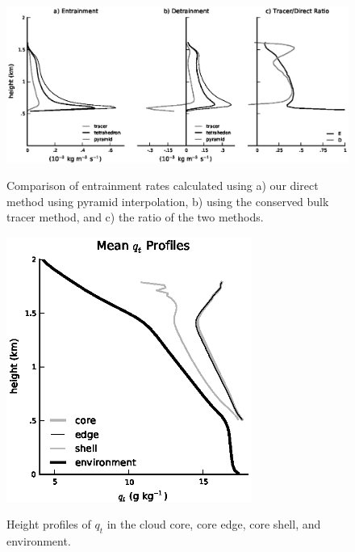 \documentclass[12pt]{article}
\begin{document}
\begin{figure}[t]
  \noindent\includegraphics[width=40pc,angle=0]{./figures/direct_vs_tracer_core.eps}\\
  \caption{Comparison of entrainment rates calculated using a) our direct method 
using pyramid interpolation, b) using the conserved bulk tracer method, and 
c) the ratio of the two methods.}\label{fig:direct_vs_tracer}
\end{figure}

\begin{figure}[t]
  \noindent\includegraphics[width=19pc,angle=0]{./figures/shell_edge_profiles_core.eps}\\
  \caption{Height profiles of $q_t$ in the cloud core, core edge, core shell, 
and environment.}\label{fig:shell_edge_profiles}
\end{figure}
\end{document}
